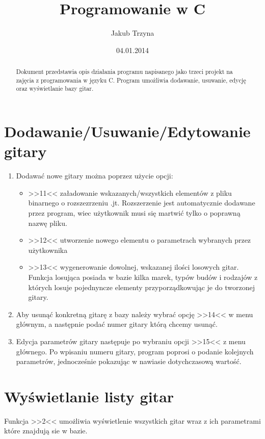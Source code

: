 \documentclass[a4paper,10pt]{article}
\title{Programowanie w C}
\author{Jakub Trzyna}
\date{04.01.2014}
\begin{document}
\maketitle

\begin{abstract}
 Dokument przedstawia opis działania programu napisanego jako trzeci projekt na zajęcia z programowania w języku C.
 Program umożliwia dodawanie, usuwanie, edycję oraz wyświetlanie bazy gitar.
\end{abstract}

\section{Dodawanie/Usuwanie/Edytowanie gitary}
\begin{enumerate}
\item Dodawać nowe gitary można poprzez użycie opcji:
\begin{itemize}
\item>>11<< załadowanie wskazanych/wszystkich elementów z pliku binarnego o rozszezrzeniu .jt. Rozszerzenie jest automatycznie dodawane przez program, wiec użytkownik musi się martwić tylko o poprawną nazwę pliku.
\item>>12<< utworzenie nowego elementu o parametrach wybranych przez użytkownika
\item>>13<< wygenerowanie dowolnej, wskazanej ilości losowych gitar.
Funkcja losująca posiada w bazie kilka marek, typów budów i rodzajów z 
których losuje pojednyncze elementy przyporządkowując je do tworzonej gitary.
\end{itemize}

\item Aby usunąć konkretną gitarę z bazy należy wybrać opcję >>14<< w menu głównym, a następnie podać numer gitary którą chcemy usunąć.
\item Edycja parametrów gitary następuje po wybraniu opcji >>15<< z menu głównego. Po wpisaniu numeru gitary, program poprosi o podanie kolejnych parametrów, jednocześnie pokazując w nawiasie dotychczasową wartość.
\end{enumerate}

\section{Wyświetlanie listy gitar}
 Funkcja >>2<< umożliwia wyświetlenie wszystkich gitar wraz z ich parametrami które znajdują sie w bazie. 
\end{document}
